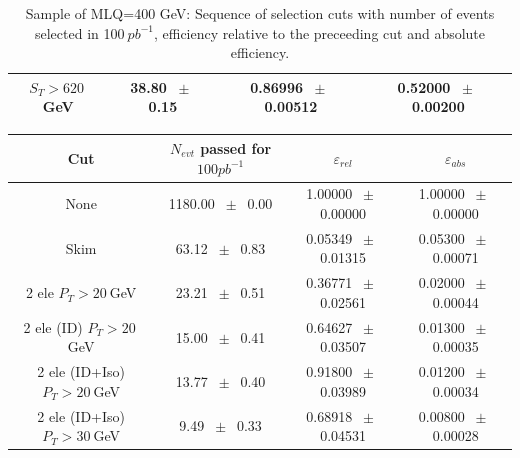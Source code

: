 \begin{table}[htbp]
\begin{center}
\begin{tabular}{|c|c|c|c|}
          $ S_T>620~$GeV           &           38.80          $~\pm~$          0.15           &           0.86996          $~\pm~$          0.00512           &           0.52000          $~\pm~$          0.00200          \\          
          \hline\hline 
\end{tabular} 
\end{center} 
\caption{Sample of MLQ=400 GeV: Sequence of selection cuts with number of events selected in 100$~pb^{-1}$, efficiency relative to the preceeding cut and absolute efficiency.} 
\label{tab:} 
\end{table} 

\begin{table}[htbp] 
\begin{center} 
\begin{tabular}{|c|c|c|c|} 
\hline\hline 
 Cut & $N_{evt}$ passed for $100pb^{-1}$ & $\varepsilon_{rel}$ & $\varepsilon_{abs}$ \\ 
\hline\hline 
None          &           1180.00          $~\pm~$          0.00           &           1.00000          $~\pm~$          0.00000           &           1.00000          $~\pm~$          0.00000          \\          
          Skim          &           63.12          $~\pm~$          0.83           &           0.05349          $~\pm~$          0.01315           &           0.05300          $~\pm~$          0.00071          \\          
          2 ele $P_T>20~$GeV          &           23.21          $~\pm~$          0.51           &           0.36771          $~\pm~$          0.02561           &           0.02000          $~\pm~$          0.00044          \\          
          2 ele (ID) $P_T>20~$GeV          &           15.00          $~\pm~$          0.41           &           0.64627          $~\pm~$          0.03507           &           0.01300          $~\pm~$          0.00035          \\          
          2 ele (ID+Iso) $P_T>20~$GeV          &           13.77          $~\pm~$          0.40           &           0.91800          $~\pm~$          0.03989           &           0.01200          $~\pm~$          0.00034          \\          
          2 ele (ID+Iso) $P_T>30~$GeV          &           9.49          $~\pm~$          0.33           &           0.68918          $~\pm~$          0.04531           &           0.00800          $~\pm~$          0.00028          \\          

\end{tabular}
\end{center}
\end{table}
